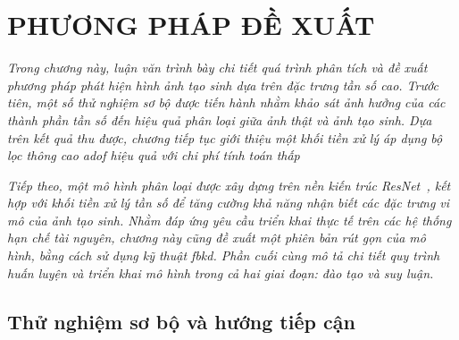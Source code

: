 \chapter{PHƯƠNG PHÁP ĐỀ XUẤT}
\label{Chapter3}
%
\textit{
Trong chương này, luận văn trình bày chi tiết quá trình phân tích và đề xuất phương pháp phát hiện hình ảnh tạo sinh dựa trên đặc trưng tần số cao. Trước tiên, một số thử nghiệm sơ bộ được tiến hành nhằm khảo sát ảnh hưởng của các thành phần tần số đến hiệu quả phân loại giữa ảnh thật và ảnh tạo sinh. Dựa trên kết quả thu được, chương tiếp tục giới thiệu một khối tiền xử lý áp dụng bộ lọc thông cao \gls{adof} hiệu quả với chi phí tính toán thấp}

\textit{Tiếp theo, một mô hình phân loại được xây dựng trên nền kiến trúc ResNet~\cite{He2015DeepRL}, kết hợp với khối tiền xử lý tần số để tăng cường khả năng nhận biết các đặc trưng vi mô của ảnh tạo sinh. Nhằm đáp ứng yêu cầu triển khai thực tế trên các hệ thống hạn chế tài nguyên, chương này cũng đề xuất một phiên bản rút gọn của mô hình, bằng cách sử dụng kỹ thuật \gls{fbkd}. Phần cuối cùng mô tả chi tiết quy trình huấn luyện và triển khai mô hình trong cả hai giai đoạn: đào tạo và suy luận.}\\
%
\section{Thử nghiệm sơ bộ và hướng tiếp cận}
%
